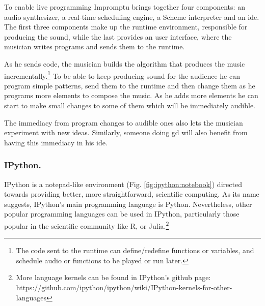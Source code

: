 \documentclass{./llncs2e/llncs}
\begin{document}
	To enable live programming Impromptu brings together four components: an audio synthesizer, a real-time scheduling engine, a Scheme interpreter and an \ac{ide}. 
	The first three components make up the runtime environment, responsible for producing the sound, while the last provides an user interface, where the musician writes programs and sends them to the runtime. 
	
	As he sends code, the musician builds the algorithm that produces the music incrementally.\footnote{The code sent to the runtime can define/redefine functions or variables, and schedule audio or functions to be played or run later.}
	To be able to keep producing sound for the audience he can program simple patterns, send them to the runtime and then change them as he programs more elements to compose the music.
	As he adds more elements he can start to make small changes to some of them which will be immediately audible.
	
	The immediacy from program changes to audible ones also lets the musician experiment with new ideas.
	Similarly, someone doing \ac{gd} will also benefit from having this immediacy in his \ac{ide}.
	
	
\subsubsection{IPython.}
	IPython\cite{PER-GRA:2007} is a notepad-like environment (Fig. \ref{fig:ipython:notebook}) directed towards providing better, more straightforward, scientific computing. 
	As its name suggests, IPython's main programming language is Python. 
	Nevertheless, other popular programming languages can be used in IPython, particularly those popular in the scientific community like R, or Julia.\footnote{More language kernels can be found in IPython's github page: https://github.com/ipython/ipython/wiki/IPython-kernels-for-other-languages}
		
\end{document}
